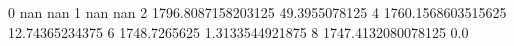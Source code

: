 0 nan nan
1 nan nan
2 1796.8087158203125 49.3955078125
4 1760.1568603515625 12.74365234375
6 1748.7265625 1.3133544921875
8 1747.4132080078125 0.0
